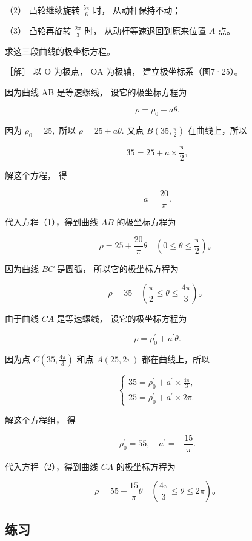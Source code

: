 （2） 凸轮继续旋转 \(\frac{5\pi}{6}\) 时， 从动杆保持不动；

（3） 凸轮再旋转 \(\frac{2\pi}{3}\) 时， 从动杆等速退回到原来位置 \(A\)
点。

求这三段曲线的极坐标方程。

［解］ 以 O 为极点， OA 为极轴， 建立极坐标系（图7·25）。

因为曲线 AB 是等速螺线， 设它的极坐标方程为

\[
\rho = \rho_{0} + a \theta. \tag {1}
\]

因为 \(\rho_0 = 25,\) 所以 \(\rho = 25 + a\theta .\) 又点
\(B\left(35, \frac{\pi}{2}\right)\) 在曲线上，所以

\[
35 = 25 + a \times \frac {\pi}{2},
\]

解这个方程， 得

\[
a = \frac {20}{\pi}.
\]

代入方程（1），得到曲线 \(AB\) 的极坐标方程为

\[
\rho = 25 + \frac {20}{\pi} \theta \quad \left(0 \leqslant \theta \leqslant \frac {\pi}{2}\right)\text{。}
\]

因为曲线 \(BC\) 是圆弧， 所以它的极坐标方程为

\[
\rho = 35 \quad \left(\frac {\pi}{2} \leqslant \theta \leqslant \frac {4 \pi}{3}\right)\text{。}
\]

由于曲线 \(CA\) 是等速螺线， 设它的极坐标方程为

\[
\rho = \rho_{0} ^ {\prime} + a^{\prime} \theta. \tag {2}
\]

因为点 \(C\left(35, \frac{4\pi}{3}\right)\) 和点 \(A(25, 2\pi)\)
都在曲线上，所以

\[
\left\{ \begin{array}{l} 35 = \rho_{0} ^ {\prime} + a^{\prime} \times \frac {4 \pi}{3}, \\ 25 = \rho_{0} ^ {\prime} + a^{\prime} \times 2 \pi. \end{array} \right.
\]

解这个方程组， 得

\[
\rho_{0} ^ {\prime} = 55, \quad a^{\prime} = - \frac {15}{\pi}.
\]

代入方程（2），得到曲线 \(CA\) 的极坐标方程为

\[
\rho = 55 - \frac {15}{\pi} \theta \quad \left(\frac {4 \pi}{3} \leqslant \theta \leqslant 2 \pi\right)\text{。}
\]

\subsection{练习}\label{ux7ec3ux4e60-22}

